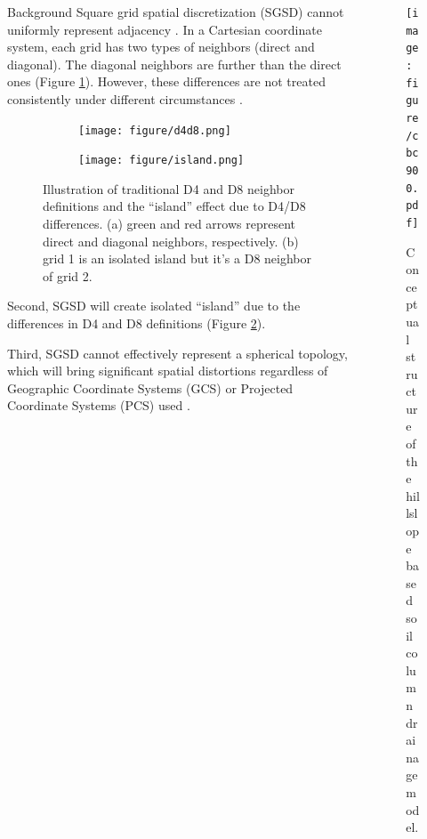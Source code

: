 \documentclass[final]{beamer}
\newlength{\sepwid}
\newlength{\onecolwid}
\newlength{\twocolwid}
\begin{document}
\begin{frame}[t]
\begin{columns}[t]
\begin{column}{\onecolwid}
      \begin{block}{Background}
        Square grid spatial discretization (SGSD) cannot uniformly represent adjacency \citep{DeSousa2006}. In a Cartesian coordinate system, each grid has two types of neighbors (direct and diagonal). The diagonal neighbors are further than the direct ones (Figure \ref{fig:d4d8}). However, these differences are not treated consistently under different circumstances \citep{Esri2011,Henson2013}. 

        \begin{figure}[H]
          \centering
          \begin{subfigure}[t]{0.48\textwidth}
              \centering
              \texttt{[image: figure/d4d8.png]}
              \caption{}
              \label{fig:d4d8}
          \end{subfigure}
           \begin{subfigure}[t]{0.48\textwidth}
              \centering
              \texttt{[image: figure/island.png]}
              \caption{}
              \label{fig:island}
          \end{subfigure}
          \caption{Illustration of traditional D4 and D8 neighbor definitions and the ``island'' effect due to D4/D8 differences. (a) green and red arrows represent direct and diagonal neighbors, respectively. (b) grid 1 is an isolated island but it's a D8 neighbor of grid 2.}
          \label{fig:d4d8_island}
      \end{figure}

      Second, SGSD will create isolated ``island'' due to the differences in D4 and D8 definitions (Figure \ref{fig:island}).

Third, SGSD cannot effectively represent a spherical topology, which will bring significant spatial distortions regardless of Geographic Coordinate Systems (GCS) or Projected Coordinate Systems (PCS) used \cite{Renssen2000,Li2013}.
               
      \end{block}
    \end{column} %
    \begin{column}{\twocolwid}
      
      \begin{figure}
        \texttt{[image: figure/cbc900.pdf]}
        \caption{Conceptual structure of the hillslope based soil column drainage model.}
        \label{fig:hillslope_column}
      \end{figure}      
     


\end{column}
\end{columns}
\end{frame}
\end{document}
